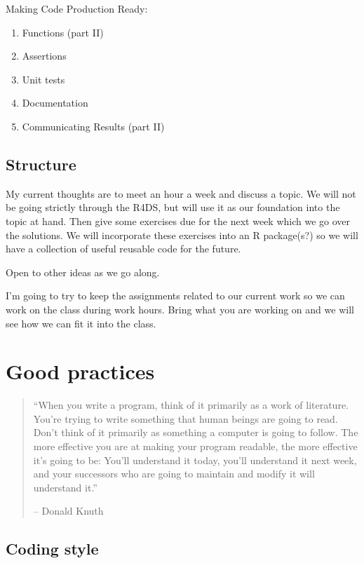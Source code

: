 \documentclass[]{book}
\providecommand{\tightlist}{%
  \setlength{\itemsep}{0pt}\setlength{\parskip}{0pt}}
\theoremstyle{definition}
\theoremstyle{definition}
\theoremstyle{definition}
\theoremstyle{remark}
\begin{document}
Making Code Production Ready:

\begin{enumerate}
\def\labelenumi{\arabic{enumi}.}
\setcounter{enumi}{9}
\tightlist
\item
  Functions (part II)
\item
  Assertions
\item
  Unit tests
\item
  Documentation
\item
  Communicating Results (part II)
\end{enumerate}

\section{Structure}\label{structure}

My current thoughts are to meet an hour a week and discuss a topic. We
will not be going strictly through the R4DS, but will use it as our
foundation into the topic at hand. Then give some exercises due for the
next week which we go over the solutions. We will incorporate these
exercises into an R package(s?) so we will have a collection of useful
reusable code for the future.

Open to other ideas as we go along.

I'm going to try to keep the assignments related to our current work so
we can work on the class during work hours. Bring what you are working
on and we will see how we can fit it into the class.

\chapter{Good practices}\label{good-practices}

\begin{quote}
``When you write a program, think of it primarily as a work of
literature. You're trying to write something that human beings are going
to read. Don't think of it primarily as something a computer is going to
follow. The more effective you are at making your program readable, the
more effective it's going to be: You'll understand it today, you'll
understand it next week, and your successors who are going to maintain
and modify it will understand it.''

-- Donald Knuth
\end{quote}

\section{Coding style}\label{coding-style}
\end{document}
